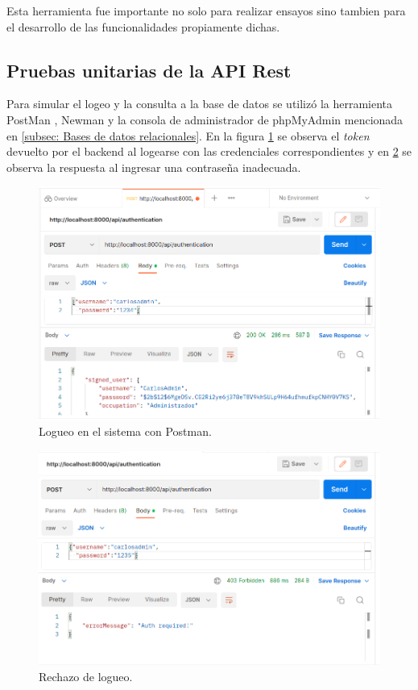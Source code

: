 Esta herramienta fue importante no solo para realizar ensayos sino tambien para el desarrollo de las funcionalidades propiamente dichas.

\pagebreak

\subsection{Pruebas unitarias de la API Rest}

Para simular el logeo y la consulta a la base de datos se utilizó la herramienta PostMan \citep{WEBSITE:30}, Newman \citep{WEBSITE:35} y la consola de administrador de phpMyAdmin mencionada en \ref{subsec: Bases de datos relacionales}. En la figura \ref{fig:Logueo en el sistema con Postman} se observa el \textit{token} devuelto por el backend al logearse con las credenciales correspondientes y en \ref{fig:Rechazo Logueo en el sistema con Postman} se observa la respuesta al ingresar una contraseña inadecuada.

\begin{figure}[ht]
	\centering
	\includegraphics[scale=.35]{./Figures/auth.png}
	\caption{Logueo en el sistema con Postman.}
	\label{fig:Logueo en el sistema con Postman}
\end{figure}

\begin{figure}[ht]
	\centering
	\includegraphics[scale=.35]{./Figures/no-auth.png}
	\caption{Rechazo de logueo.}
	\label{fig:Rechazo Logueo en el sistema con Postman}
\end{figure}

